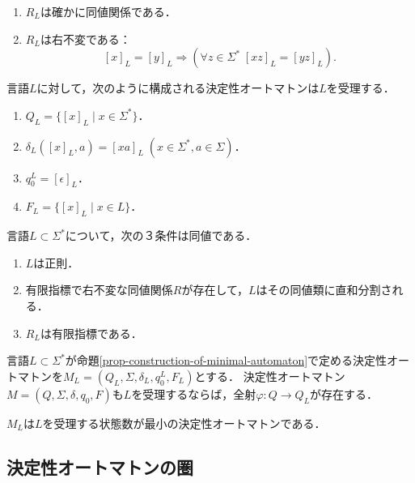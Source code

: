 \begin{proposition}\mbox{}
    \begin{enumerate}
        \item $R_L$は確かに同値関係である．
        \item $R_L$は右不変である：
        \[ [x]_L=[y]_L\Rightarrow (\forall z\in\Sigma^*\;[xz]_L=[yz]_L). \]
    \end{enumerate}
\end{proposition}

\begin{proposition}\label{prop-construction-of-minimal-automaton}
    言語$L$に対して，次のように構成される決定性オートマトンは$L$を受理する．
    \begin{enumerate}
        \item $Q_L=\{[x]_L\mid x\in\Sigma^*\}$．
        \item $\delta_L([x]_L,a)=[xa]_L\;(x\in\Sigma^*,a\in\Sigma)$．
        \item $q_0^L=[\epsilon]_L$．
        \item $F_L=\{[x]_L\mid x\in L\}$．
    \end{enumerate}
\end{proposition}

\begin{theorem}
    言語$L\subset\Sigma^*$について，次の３条件は同値である．
    \begin{enumerate}
        \item $L$は正則．
        \item 有限指標で右不変な同値関係$R$が存在して，$L$はその同値類に直和分割される．
        \item $R_L$は有限指標である．
    \end{enumerate}
\end{theorem}

\begin{theorem}
    言語$L\subset\Sigma^*$が命題\ref{prop-construction-of-minimal-automaton}で定める決定性オートマトンを$M_L=(Q_L,\Sigma,\delta_L,q_0^L,F_L)$とする．
    決定性オートマトン$M=(Q,\Sigma,\delta,q_0,F)$も$L$を受理するならば，全射$\varphi:Q\to Q_L$が存在する．
\end{theorem}

\begin{corollary}
    $M_L$は$L$を受理する状態数が最小の決定性オートマトンである．
\end{corollary}

\subsection{決定性オートマトンの圏}



